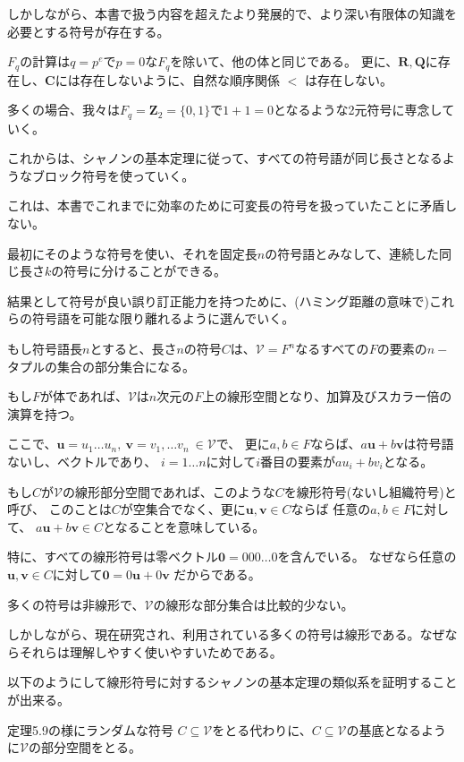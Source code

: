 \documentclass[12pt,a4paper]{article}
\begin{document}
しかしながら、本書で扱う内容を超えたより発展的で、より深い有限体の知識を必要とする符号が存在する。

$F_q$の計算は$q = p^e$で$p = 0$な$F_q$を除いて、他の体と同じである。
更に、$\mathbf{R}, \mathbf{Q}$に存在し、$\mathbf{C}$には存在しないように、自然な順序関係
$ < $ は存在しない。

多くの場合、我々は$F_q = \mathbf{Z}_2 = \lbrace 0, 1 \rbrace$で$
1 + 1 = 0$となるような2元符号に専念していく。

これからは、シャノンの基本定理に従って、すべての符号語が同じ長さとなるようなブロック符号を使っていく。

これは、本書でこれまでに効率のために可変長の符号を扱っていたことに矛盾しない。

最初にそのような符号を使い、それを固定長$n$の符号語とみなして、連続した同じ長さ$k$の符号に分けることができる。

結果として符号が良い誤り訂正能力を持つために、(ハミング距離の意味で)これらの符号語を可能な限り離れるように選んでいく。

もし符号語長$n$とすると、長さ$n$の符号$C$は、$\mathcal{V} = F^n$なるすべての$F$の要素の$n-$タプルの集合の部分集合になる。

もし$F$が体であれば、$\mathcal{V}$は$n$次元の$F$上の線形空間となり、加算及びスカラー倍の演算を持つ。

ここで、$\mathbf{u} = u_1 \dots u_n , ~\mathbf{v} = v_1,
\dots v_n ~\in \mathcal{V} $で、 更に$a, b \in F $ならば、$a
\mathbf u + b \mathbf v$は符号語ないし、ベクトルであり、
$i = 1 \dots n$に対して$i$番目の要素が$au_i + bv_i$となる。

もし$C$が$\mathcal{V}$の線形部分空間であれば、このような$C$を線形符号(ないし組織符号)と呼び、
このことは$C$が空集合でなく、更に$\mathbf{u}, \mathbf{v} \in C$ならば
任意の$a, b \in F$に対して、
$a \mathbf{u} + b \mathbf{v} \in C$となることを意味している。

特に、すべての線形符号は零ベクトル$\mathbf{0} = 000\dots0$を含んでいる。
なぜなら任意の$\mathbf{u}, \mathbf{v} \in C$に対して$\mathbf{0} = 0 \mathbf{u} + 0 \mathbf{v}$
だからである。

多くの符号は非線形で、$\mathcal{V}$の線形な部分集合は比較的少ない。

しかしながら、現在研究され、利用されている多くの符号は線形である。なぜならそれらは理解しやすく使いやすいためである。

以下のようにして線形符号に対するシャノンの基本定理の類似系を証明することが出来る。

定理5.9の様にランダムな符号
$C \subseteq \mathcal{V}$をとる代わりに、$C \subseteq \mathcal{V}$の基底となるように$\mathcal{V}$の部分空間をとる。
\end{document}
